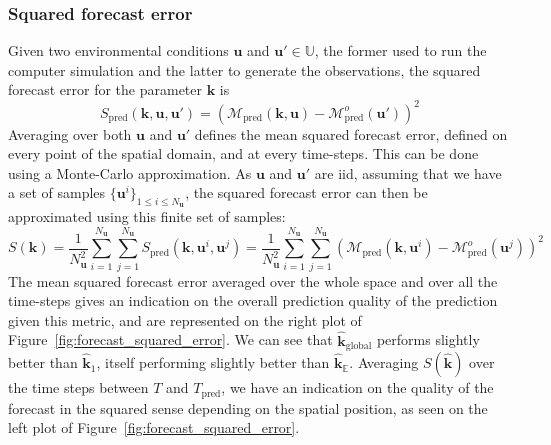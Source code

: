 \documentclass[preprint, 1p]{elsarticle}
\newcommand{\Ex}{\mathbb{E}}
\newcommand{\hatkmean}{\hat{\mathbf{k}}_{\Ex}}
\newcommand{\kest}{\hat{\mathbf{k}}}
\newcommand{\Uspace}{\mathbb{U}}
\begin{document}
\subsubsection{Squared forecast error}
Given two environmental conditions $\mathbf{u}$ and $\mathbf{u}'\in \Uspace$, the former used to run the computer simulation and the latter to generate the observations, the squared forecast error for the parameter $\mathbf{k}$ is
\begin{equation}
\label{eq:squared_forecast_error}
S_{\mathrm{pred}}(\mathbf{k},\mathbf{u},\mathbf{u}') = \left(\mathcal{M}_{\mathrm{pred}}(\mathbf{k},\mathbf{u}) - \mathcal{M}^{o}_{\mathrm{pred}}(\mathbf{u}')\right)^2
\end{equation}
Averaging over both $\mathbf{u}$ and $\mathbf{u}'$ defines the mean squared forecast error, defined on every point of the spatial domain, and at every time-steps. This can be done using a Monte-Carlo approximation. As $\mathbf{u}$ and $\mathbf{u}'$ are iid, assuming that we have a set of samples $\{\mathbf{u}^i\}_{1\leq i \leq N_{\mathbf{u}}}$, the squared forecast error can then be approximated using this finite set of samples:
\begin{equation}
  \label{eq:squared_forecast_error_averaged}
  S(\mathbf{k}) = \frac{1}{N_{\mathbf{u}}^2 }\sum_{i=1}^{N_{\mathbf{u}}}\sum_{j=1}^{N_{\mathbf{u}}} S_{\mathrm{pred}}(\mathbf{k},\mathbf{u}^i,\mathbf{u}^j) = \frac{1}{N_{\mathbf{u}}^2 }\sum_{i=1}^{N_{\mathbf{u}}}\sum_{j=1}^{N_{\mathbf{u}}}  \left(\mathcal{M}_{\mathrm{pred}}(\mathbf{k},\mathbf{u}^i) - \mathcal{M}^{o}_{\mathrm{pred}}(\mathbf{u}^j)\right)^2
\end{equation}
The mean squared forecast error averaged over the whole space and over all the time-steps gives an indication on the overall prediction quality of the prediction given this metric, and are represented on the right plot of Figure~\ref{fig:forecast_squared_error}. We can see that $\kest_{\mathrm{global}}$ performs slightly better than $\kest_1$, itself performing slightly better than $\hatkmean$.
Averaging $S(\mathbf{\kest})$ over the time steps between $T$ and $T_{\mathrm{pred}}$, we have an indication on the quality of the forecast in the squared sense depending on the spatial position, as seen on the left plot of Figure~\ref{fig:forecast_squared_error}.
\end{document}
